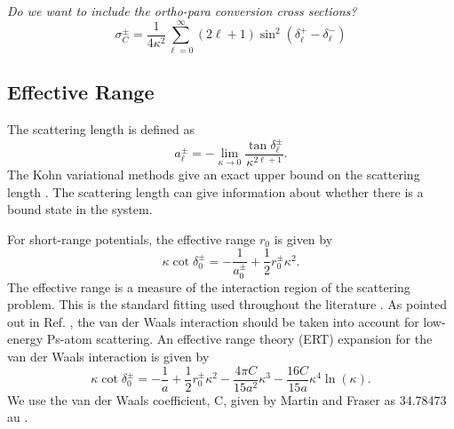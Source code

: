 \documentclass[preprint,showpacs,preprintnumbers,amsmath,amssymb]{revtex4}
\begin{document}
\emph{Do we want to include the ortho-para conversion cross sections? \cite{}}
\begin{equation}
\label{eq:OrthoParaCross}
\sigma_{C}^\pm = \frac{1}{4 \kappa^2} \sum_{\ell=0}^\infty (2 \ell+1) \sin^2 (\delta_\ell^+ - \delta_\ell^-)
\end{equation}


\subsection{Effective Range}

The scattering length is defined as \citep[p. 589]{Bransden2003}
\begin{equation}
\label{eq:ScatLen}
a_\ell^\pm = -\lim_{\kappa \to 0} \frac{\tan{\delta_\ell^\pm}}{\kappa^{2\ell+1}}.
\end{equation}
The Kohn variational methods give an exact upper bound on the scattering length \cite{Joachain1979}. The scattering length can give information about whether there is a bound state in the system. 

For short-range potentials, the effective range $r_0$ is given by \cite{Bethe1949,Blatt1949}
\begin{equation}
\label{eq:EffectiveRangeShort}
\kappa \cot\delta_0^\pm = -\frac{1}{a_0^\pm} + \frac{1}{2} r_0^\pm \kappa^2.
\end{equation}
The effective range is a measure of the interaction region of the scattering problem. This is the standard fitting used throughout the literature \cite{Ivanov2002,VanReeth2003,Blackwood2002,Walters2004}. As pointed out in Ref. \cite{Fabrikant2014}, the van der Waals interaction should be taken into account for low-energy Ps-atom scattering. An effective range theory (ERT) expansion for the van der Waals interaction is given by \cite[p. 668]{Drake2006}
\begin{equation}
\label{eq:EffectiveRangeLongAu}
\kappa \cot\delta_0^\pm = -\frac{1}{a} + \frac{1}{2} r_0^\pm \kappa^2 - \frac{4 \pi C}{15 a^2} \kappa^3 - \frac{16 C}{15 a} \kappa^4 \ln \left(\kappa \right).
\end{equation}
We use the van der Waals coefficient, C, given by Martin and Fraser as 34.78473 au \cite{Martin1980}.
\end{document}
